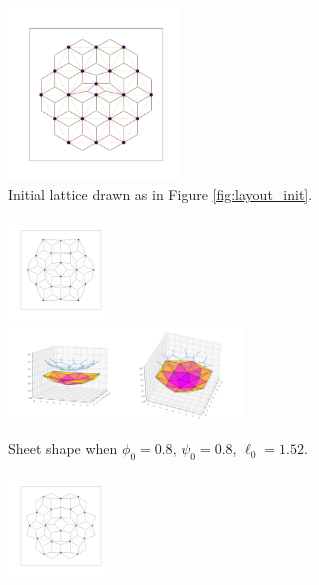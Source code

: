 \documentclass[draft]{article}
\begin{document}
\begin{figure}[htbp]
    \centering
    \begin{subfigure}[b]{\textwidth}
        \centering
        \includegraphics[width=0.5\textwidth]{figures/numerical/bump/bump_graph.png}
        \caption{Initial lattice drawn as in Figure \ref{fig:layout_init}.}
        \label{subfig:bump_graph}
    \end{subfigure}
    \begin{subfigure}[b]{\textwidth}
        \centering
        \includegraphics[width=0.3\textwidth]{figures/numerical/bump/bump0.8_0.8_1.52_10_graph.png}
        \includegraphics[width=0.69\textwidth]{figures/numerical/bump/bump0.8_0.8_1.52_10_plot.png}
        \caption{Sheet shape when $\phi_0=0.8$, $\psi_0=0.8$, $\ell_0=1.52$.}
        \label{subfig:bump_in}
    \end{subfigure}
    \begin{subfigure}[b]{\textwidth}
        \centering
        \includegraphics[width=0.3\textwidth]{figures/numerical/bump/bump0.95_0.8_1.52_10_graph.png}

\end{subfigure}
\end{figure}
\end{document}
